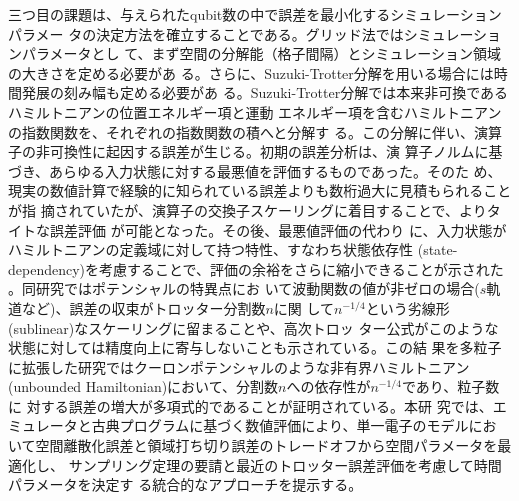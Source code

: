 \documentclass[wabun2025.tex]{subfiles}
\begin{document}
三つ目の課題は、与えられたqubit数の中で誤差を最小化するシミュレーションパラメー
タの決定方法を確立することである。グリッド法ではシミュレーションパラメータとし
て、まず空間の分解能（格子間隔）とシミュレーション領域の大きさを定める必要があ
る。さらに、Suzuki-Trotter分解を用いる場合には時間発展の刻み幅も定める必要があ
る。Suzuki-Trotter分解では本来非可換であるハミルトニアンの位置エネルギー項と運動
エネルギー項を含むハミルトニアンの指数関数を、それぞれの指数関数の積へと分解す
る。この分解に伴い、演算子の非可換性に起因する誤差が生じる。初期の誤差分析は、演
算子ノルムに基づき、あらゆる入力状態に対する最悪値を評価するものであった。そのた
め、現実の数値計算で経験的に知られている誤差よりも数桁過大に見積もられることが指
摘されていたが、演算子の交換子スケーリングに着目することで、よりタイトな誤差評価
が可能となった\cite{Childs2021.PhysRevX.11.011020}。その後、最悪値評価の代わり
に、入力状態がハミルトニアンの定義域に対して持つ特性、すなわち状態依存性
(state-dependency)を考慮することで、評価の余裕をさらに縮小できることが示された
\cite{Burgarth2024.PhysRevResearch.6.043155}。同研究ではポテンシャルの特異点にお
いて波動関数の値が非ゼロの場合($s$軌道など)、誤差の収束がトロッター分割数$n$に関
して$n^{-1/4}$という劣線形(sublinear)なスケーリングに留まることや、高次トロッ
ター公式がこのような状態に対しては精度向上に寄与しないことも示されている。この結
果を多粒子に拡張した研究ではクーロンポテンシャルのような非有界ハミルトニアン
(unbounded Hamiltonian)において、分割数$n$への依存性が$n^{-1/4}$であり、粒子数に
対する誤差の増大が多項式的であることが証明されている\cite{fang2026trotter}。本研
究では、エミュレータと古典プログラムに基づく数値評価により、単一電子のモデルにお
いて空間離散化誤差と領域打ち切り誤差のトレードオフから空間パラメータを最適化し、
サンプリング定理の要請と最近のトロッター誤差評価を考慮して時間パラメータを決定す
る統合的なアプローチを提示する。
\end{document}
